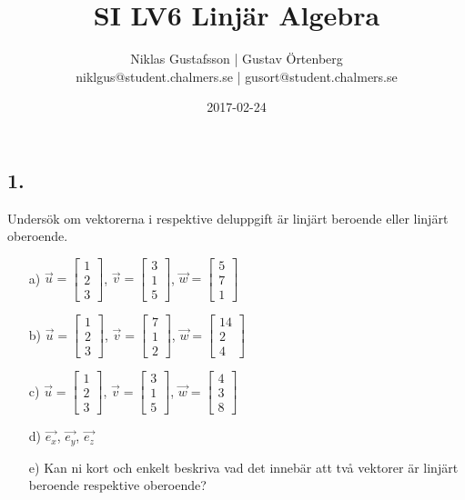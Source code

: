 \documentclass{article}
\title{SI LV6 Linjär Algebra}
\author{Niklas Gustafsson | Gustav Örtenberg  \\ \small{niklgus@student.chalmers.se} | \small{gusort@student.chalmers.se}}
\date{2017-02-24}
\begin{document}
\maketitle
\subsection*{1.}
Undersök om vektorerna i respektive deluppgift är linjärt beroende eller linjärt oberoende.
\begin{itemize}
	\item[a) ] $\vec{u} = \begin{bmatrix} 1 \\ 2 \\ 3 \end{bmatrix}$, $\vec{v} = \begin{bmatrix} 3 \\ 1 \\ 5 \end{bmatrix}$, $\vec{w} = \begin{bmatrix} 5 \\ 7 \\ 1 \end{bmatrix}$
	\item[b) ] $\vec{u} = \begin{bmatrix} 1 \\ 2 \\ 3 \end{bmatrix}$, $\vec{v} = \begin{bmatrix} 7 \\ 1 \\ 2 \end{bmatrix}$, $\vec{w} = \begin{bmatrix} 14 \\ 2 \\ 4 \end{bmatrix}$
	\item[c) ] $\vec{u} = \begin{bmatrix} 1 \\ 2 \\ 3 \end{bmatrix}$, $\vec{v} = \begin{bmatrix} 3 \\ 1 \\ 5 \end{bmatrix}$, $\vec{w} = \begin{bmatrix} 4 \\ 3 \\ 8 \end{bmatrix}$
	\item[d) ] $\vec{e_x}$, $\vec{e_y}$, $\vec{e_z}$
	\item[e) ] Kan ni kort och enkelt beskriva vad det innebär att två vektorer är linjärt beroende respektive oberoende?
\end{itemize}
\end{document}
